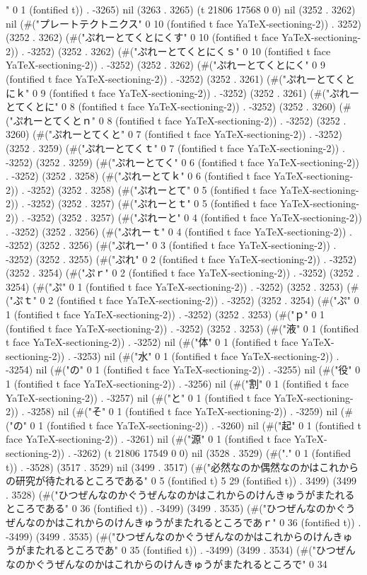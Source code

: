 " 0 1 (fontified t)) . -3265) nil (3263 . 3265) (t 21806 17568 0 0) nil (3252 . 3262) nil (#("プレートテクトニクス" 0 10 (fontified t face YaTeX-sectioning-2)) . 3252) (3252 . 3262) (#("ぷれーとてくとにくす" 0 10 (fontified t face YaTeX-sectioning-2)) . -3252) (3252 . 3262) (#("ぷれーとてくとにくｓ" 0 10 (fontified t face YaTeX-sectioning-2)) . -3252) (3252 . 3262) (#("ぷれーとてくとにく" 0 9 (fontified t face YaTeX-sectioning-2)) . -3252) (3252 . 3261) (#("ぷれーとてくとにｋ" 0 9 (fontified t face YaTeX-sectioning-2)) . -3252) (3252 . 3261) (#("ぷれーとてくとに" 0 8 (fontified t face YaTeX-sectioning-2)) . -3252) (3252 . 3260) (#("ぷれーとてくとｎ" 0 8 (fontified t face YaTeX-sectioning-2)) . -3252) (3252 . 3260) (#("ぷれーとてくと" 0 7 (fontified t face YaTeX-sectioning-2)) . -3252) (3252 . 3259) (#("ぷれーとてくｔ" 0 7 (fontified t face YaTeX-sectioning-2)) . -3252) (3252 . 3259) (#("ぷれーとてく" 0 6 (fontified t face YaTeX-sectioning-2)) . -3252) (3252 . 3258) (#("ぷれーとてｋ" 0 6 (fontified t face YaTeX-sectioning-2)) . -3252) (3252 . 3258) (#("ぷれーとて" 0 5 (fontified t face YaTeX-sectioning-2)) . -3252) (3252 . 3257) (#("ぷれーとｔ" 0 5 (fontified t face YaTeX-sectioning-2)) . -3252) (3252 . 3257) (#("ぷれーと" 0 4 (fontified t face YaTeX-sectioning-2)) . -3252) (3252 . 3256) (#("ぷれーｔ" 0 4 (fontified t face YaTeX-sectioning-2)) . -3252) (3252 . 3256) (#("ぷれー" 0 3 (fontified t face YaTeX-sectioning-2)) . -3252) (3252 . 3255) (#("ぷれ" 0 2 (fontified t face YaTeX-sectioning-2)) . -3252) (3252 . 3254) (#("ぷｒ" 0 2 (fontified t face YaTeX-sectioning-2)) . -3252) (3252 . 3254) (#("ぷ" 0 1 (fontified t face YaTeX-sectioning-2)) . -3252) (3252 . 3253) (#("ぷｔ" 0 2 (fontified t face YaTeX-sectioning-2)) . -3252) (3252 . 3254) (#("ぷ" 0 1 (fontified t face YaTeX-sectioning-2)) . -3252) (3252 . 3253) (#("ｐ" 0 1 (fontified t face YaTeX-sectioning-2)) . -3252) (3252 . 3253) (#("液" 0 1 (fontified t face YaTeX-sectioning-2)) . -3252) nil (#("体" 0 1 (fontified t face YaTeX-sectioning-2)) . -3253) nil (#("水" 0 1 (fontified t face YaTeX-sectioning-2)) . -3254) nil (#("の" 0 1 (fontified t face YaTeX-sectioning-2)) . -3255) nil (#("役" 0 1 (fontified t face YaTeX-sectioning-2)) . -3256) nil (#("割" 0 1 (fontified t face YaTeX-sectioning-2)) . -3257) nil (#("と" 0 1 (fontified t face YaTeX-sectioning-2)) . -3258) nil (#("そ" 0 1 (fontified t face YaTeX-sectioning-2)) . -3259) nil (#("の" 0 1 (fontified t face YaTeX-sectioning-2)) . -3260) nil (#("起" 0 1 (fontified t face YaTeX-sectioning-2)) . -3261) nil (#("源" 0 1 (fontified t face YaTeX-sectioning-2)) . -3262) (t 21806 17549 0 0) nil (3528 . 3529) (#("." 0 1 (fontified t)) . -3528) (3517 . 3529) nil (3499 . 3517) (#("必然なのか偶然なのかはこれからの研究が待たれるところである" 0 5 (fontified t) 5 29 (fontified t)) . 3499) (3499 . 3528) (#("ひつぜんなのかぐうぜんなのかはこれからのけんきゅうがまたれるところである" 0 36 (fontified t)) . -3499) (3499 . 3535) (#("ひつぜんなのかぐうぜんなのかはこれからのけんきゅうがまたれるところであｒ" 0 36 (fontified t)) . -3499) (3499 . 3535) (#("ひつぜんなのかぐうぜんなのかはこれからのけんきゅうがまたれるところであ" 0 35 (fontified t)) . -3499) (3499 . 3534) (#("ひつぜんなのかぐうぜんなのかはこれからのけんきゅうがまたれるところで" 0 34 